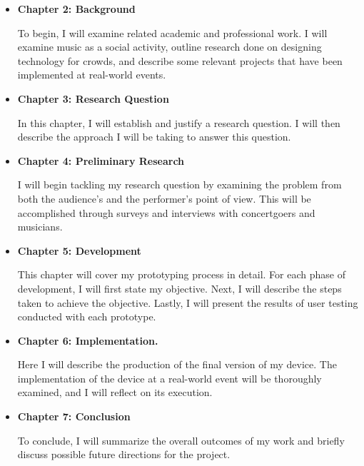 \begin{itemize}
	\item \textbf{Chapter 2: Background}
	
	To begin, I will examine related academic and professional work. I will examine music as a social activity, outline research done on designing technology for crowds, and describe some relevant projects that have been implemented at real-world events.
	
	\item \textbf{Chapter 3: Research Question}
	
	In this chapter, I will establish and justify a research question. I will then describe the approach I will be taking to answer this question.
	
	\item \textbf{Chapter 4: Preliminary Research}
	
	I will begin tackling my research question by examining the problem from both the audience's and the performer's point of view. This will be accomplished through surveys and interviews with concertgoers and musicians.
		
	\item \textbf{Chapter 5: Development}
	
	This chapter will cover my prototyping process in detail. For each phase of development, I will first state my objective. Next, I will describe the steps taken to achieve the objective. Lastly, I will present the results of user testing conducted with each prototype.
		
	\item \textbf{Chapter 6: Implementation.}
	
	Here I will describe the production of the final version of my device. The implementation of the device at a real-world event will be thoroughly examined, and I will reflect on its execution.
	
	\item \textbf{Chapter 7: Conclusion}
	
	To conclude, I will summarize the overall outcomes of my work and briefly discuss possible future directions for the project.
\end{itemize}
